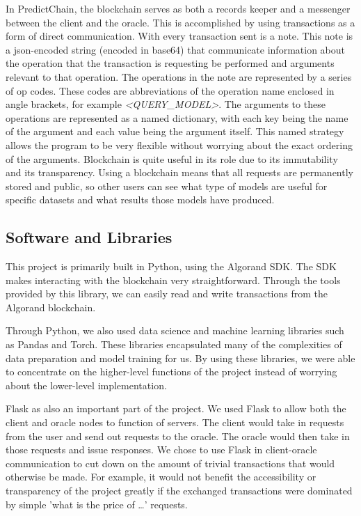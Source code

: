 \documentclass{article}
\begin{document}
    In PredictChain, the blockchain serves as both a records keeper and a messenger between the client and the oracle.
    This is accomplished by using transactions as a form of direct communication.  With every transaction sent is a note.
    This note is a json-encoded string (encoded in base64) that communicate information about the operation that the transaction
    is requesting be performed and arguments relevant to that operation.  The operations in the note are represented by a series
    of op codes.  These codes are abbreviations of the operation name enclosed in angle brackets, for example \textit{<QUERY\_MODEL>}.
    The arguments to these operations are represented as a named dictionary, with each key being the name of the argument and each
    value being the argument itself.  This named strategy allows the program to be very flexible without worrying about the exact
    ordering of the arguments.  Blockchain is quite useful in its role due to its immutability and its transparency.  Using
    a blockchain means that all requests are permanently stored and public, so other users can see what type of models are useful
    for specific datasets and what results those models have produced.

    \subsection{Software and Libraries}

    This project is primarily built in Python, using the Algorand SDK.  The SDK makes interacting with the blockchain
    very straightforward.  Through the tools provided by this library, we can easily read and write transactions from
    the Algorand blockchain.

    Through Python, we also used data science and machine learning libraries such as Pandas
    and Torch.  These libraries encapsulated many of the complexities of data preparation and model training for us.
    By using these libraries, we were able to concentrate on the higher-level functions of the project instead of worrying
    about the lower-level implementation.

    Flask as also an important part of the project.  We used Flask to allow both
    the client and oracle nodes to function of servers.  The client would take in requests from the user and send out
    requests to the oracle.  The oracle would then take in those requests and issue responses.  We chose to use Flask in
    client-oracle communication to cut down on the amount of trivial transactions that would otherwise be made.  For example,
    it would not benefit the accessibility or transparency of the project greatly if the exchanged transactions were
    dominated by simple 'what is the price of \ldots' requests.
\end{document}
